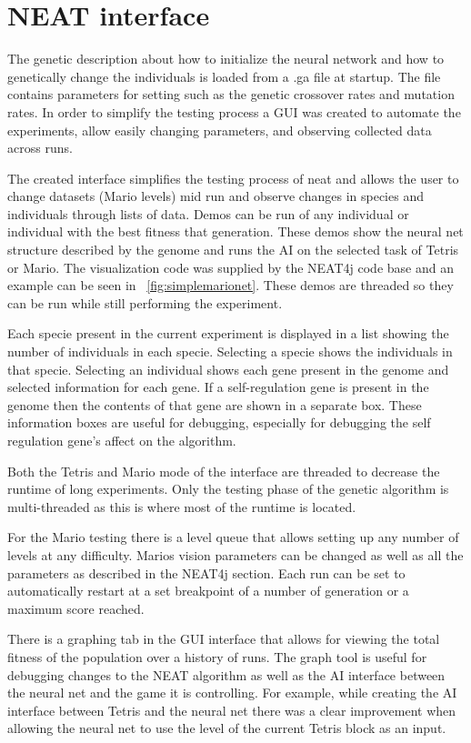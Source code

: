 \documentclass[12pt]{ucthesis} \newif\ifpdf \ifx\pdfoutput\undefined
\begin{document}
\section{NEAT interface}

The genetic description about how to initialize the neural network and how to
genetically change the individuals is loaded from a .ga file at startup. The
file contains parameters for setting such as the genetic crossover rates and
mutation rates. In order to simplify the testing process a GUI was created to
automate the experiments, allow easily changing parameters, and observing
collected data across runs.

The created interface simplifies the testing process of neat and allows the user
to change datasets (Mario levels) mid run and observe changes in species and
individuals through lists of data. Demos can be run of any individual or
individual with the best fitness that generation. These demos show the neural
net structure described by the genome and runs the AI on the selected task of
Tetris or Mario. The visualization code was supplied by the NEAT4j code base
and an example can be seen in ~\ref{fig:simplemarionet}.
These demos are threaded so they can be run while still performing the
experiment.

Each specie present in the current experiment is displayed in a list showing the
number of individuals in each specie. Selecting a specie shows the
individuals in that specie.
Selecting an individual shows each gene present in the genome and selected
information for each gene. If a self-regulation gene is present in the genome
then the contents of that gene are shown in a separate box. These information
boxes are useful for debugging, especially for debugging the self regulation
gene's affect on the algorithm.

Both the Tetris and Mario mode of the interface are threaded to decrease the
runtime of long experiments. Only the testing phase of the genetic algorithm is
multi-threaded as this is where most of the runtime is located.

For the Mario testing there is a level queue that allows setting up any number
of levels at any difficulty.  Marios vision parameters can be changed as well as
all the parameters as described in the NEAT4j section. Each run can be set to
automatically restart at a set breakpoint of a number of generation or a maximum
score reached.

There is a graphing tab in the GUI interface that allows for viewing the total
fitness of the population over a history of runs. The graph tool is useful for
debugging changes to the NEAT algorithm as well as the AI interface between the
neural net and the game it is controlling. For example, while creating the AI
interface between Tetris and the neural net there was a clear improvement when
allowing the neural net to use the level of the current Tetris block as an
input. 
\end{document}
